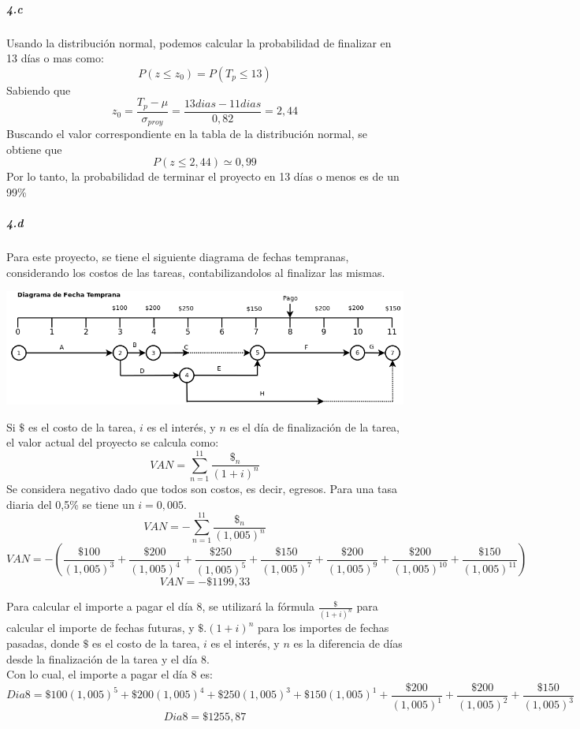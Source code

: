 \documentclass[a4paper,10pt]{article}
\begin{document}
  \subparagraph {4.c} Usando la distribución normal, podemos calcular la probabilidad de finalizar en 13 días o mas como:
  $$P(z \leq z_0) = P(T_p \leq 13)$$
  Sabiendo que 
  $$z_0 = \frac{T_p - \mu}{\sigma_{proy}} = \frac{13dias - 11dias}{0,82} = 2,44 $$
  Buscando el valor correspondiente en la tabla de la distribución normal, se obtiene que
  $$P(z \leq 2,44) \simeq 0,99 $$
  Por lo tanto, la probabilidad de terminar el proyecto en 13 días o menos es de un 99\%
  
  \subparagraph {4.d} Para este proyecto, se tiene el siguiente diagrama de fechas tempranas, considerando los costos de las tareas, contabilizandolos al finalizar las mismas. 
    \begin{center}
    \includegraphics[scale=0.55,keepaspectratio=true]{img/ej4-fechatemprana.png} 
  \end{center}
  Si $ \$$ es el costo de la tarea, $i$ es el interés, y $n$ es el día de finalización de la tarea, el valor actual del proyecto se calcula como:
  $$VAN = \sum _{n=1}^{11} {\frac{\$_n}{(1+i)^n}}$$
  Se considera negativo dado que todos son costos, es decir, egresos. Para una tasa diaria del 0,5\% se tiene un $i=0,005$.
  $$VAN = - \sum _{n=1}^{11} {\frac{\$_n}{(1,005)^n}}$$
  $$VAN = - \left( \frac{\$100}{(1,005)^3} + \frac{\$200}{(1,005)^4} + \frac{\$250}{(1,005)^5} + \frac{\$150}{(1,005)^7} + \frac{\$200}{(1,005)^9} + \frac{\$200}{(1,005)^{10}} + \frac{\$150}{(1,005)^{11}}\right)$$
  $$VAN = -\$1199,33$$
  
  Para calcular el importe a pagar el día 8, se utilizará la fórmula $\frac{\$}{(1+i)^n} $ para calcular el importe de fechas futuras, y $ \$ . (1+i)^n $ para los importes de fechas pasadas,
  donde $ \$$ es el costo de la tarea, $i$ es el interés, y $n$ es la diferencia de días desde la finalización de la tarea y el día 8.\\
    Con lo cual, el importe a pagar el día 8 es: 
  $$Dia 8 = \$100(1,005)^5 + \$200 (1,005)^4 + \$250(1,005)^3 + \$150(1,005)^1 + \frac{\$200}{(1,005)^1} + \frac{\$200}{(1,005)^2} + \frac{\$150}{(1,005)^3} $$
  $$Dia 8 = \$ 1255,87$$
  
\end{document}
